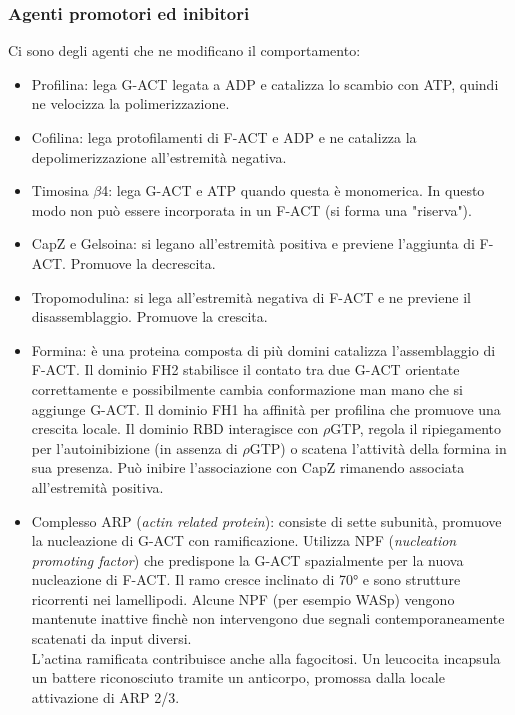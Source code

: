        \subsubsection{Agenti promotori ed inibitori}
            Ci sono degli agenti che ne modificano il comportamento:
            \begin{itemize}
                \item Profilina: lega G-ACT legata a ADP e catalizza lo scambio con ATP, quindi ne velocizza la polimerizzazione.
                \item Cofilina: lega protofilamenti di F-ACT e ADP e ne catalizza la depolimerizzazione all'estremità negativa.
                \item Timosina $\beta$4: lega G-ACT e ATP quando questa è monomerica. In questo modo non può essere incorporata in un F-ACT (si forma una "riserva").
                \item CapZ e Gelsoina: si legano all'estremità positiva e previene l'aggiunta di F-ACT. Promuove la decrescita.
                \item Tropomodulina: si lega all'estremità negativa di F-ACT e ne previene il disassemblaggio. Promuove la crescita.
                \item Formina: è una proteina composta di più domini catalizza l'assemblaggio di F-ACT. Il dominio FH2 stabilisce il contato tra due G-ACT orientate correttamente e possibilmente cambia conformazione man mano che si aggiunge G-ACT. Il dominio FH1 ha affinità per profilina che promuove una crescita locale. Il dominio RBD interagisce con $\rho$GTP, regola il ripiegamento per l'autoinibizione (in assenza di $\rho$GTP) o scatena l'attività della formina in sua presenza.
                Può inibire l'associazione con CapZ rimanendo associata all'estremità positiva.
                \item Complesso ARP (\textit{actin related protein}): consiste di sette subunità, promuove la nucleazione di G-ACT con ramificazione. Utilizza NPF (\textit{nucleation promoting factor}) che predispone la G-ACT spazialmente per la nuova nucleazione di F-ACT. Il ramo cresce inclinato di 70° e sono strutture ricorrenti nei lamellipodi.
                Alcune NPF (per esempio WASp) vengono mantenute inattive finchè non intervengono due segnali contemporaneamente scatenati da input diversi. \\
                L'actina ramificata contribuisce anche alla fagocitosi. Un leucocita incapsula un battere riconosciuto tramite un anticorpo, promossa dalla locale attivazione di ARP 2/3.
                \end{itemize}
